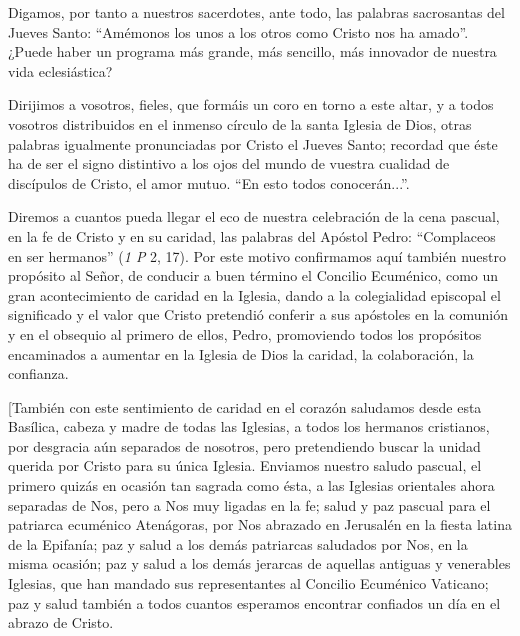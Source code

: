 			\begin{body}Digamos, por tanto a nuestros sacerdotes, ante todo, las palabras sacrosantas del Jueves Santo: “Amémonos los unos a los otros como Cristo nos ha amado”. ¿Puede haber un programa más grande, más sencillo, más innovador de nuestra vida eclesiástica?\end{body}
			
			\begin{body}Dirijimos a vosotros, fieles, que formáis un coro en torno a este altar, y a todos vosotros distribuidos en el inmenso círculo de la santa Iglesia de Dios, otras palabras igualmente pronunciadas por Cristo el Jueves Santo; recordad que éste ha de ser el signo distintivo a los ojos del mundo de vuestra cualidad de discípulos de Cristo, el amor mutuo. “En esto todos conocerán...”.\end{body}
			
			\begin{body}Diremos a cuantos pueda llegar el eco de nuestra celebración de la cena pascual, en la fe de Cristo y en su caridad, las palabras del Apóstol Pedro: “Complaceos en ser hermanos” (\textit{1 P} 2, 17). Por este motivo confirmamos aquí también nuestro propósito al Señor, de conducir a buen término el Concilio Ecuménico, como un gran acontecimiento de caridad en la Iglesia, dando a la colegialidad episcopal el significado y el valor que Cristo pretendió conferir a sus apóstoles en la comunión y en el obsequio al primero de ellos, Pedro, promoviendo todos los propósitos encaminados a aumentar en la Iglesia de Dios la caridad, la colaboración, la confianza.\end{body}
			
			\begin{body}\begin{bodysmall}[También con este sentimiento de caridad en el corazón saludamos desde esta Basílica, cabeza y madre de todas las Iglesias, a todos los hermanos cristianos, por desgracia aún separados de nosotros, pero pretendiendo buscar la unidad querida por Cristo para su única Iglesia. Enviamos nuestro saludo pascual, el primero quizás en ocasión tan sagrada como ésta, a las Iglesias orientales ahora separadas de Nos, pero a Nos muy ligadas en la fe; salud y paz pascual para el patriarca ecuménico Atenágoras, por Nos abrazado en Jerusalén en la fiesta latina de la Epifanía; paz y salud a los demás patriarcas saludados por Nos, en la misma ocasión; paz y salud a los demás jerarcas de aquellas antiguas y venerables Iglesias, que han mandado sus representantes al Concilio Ecuménico Vaticano; paz y salud también a todos cuantos esperamos encontrar confiados un día en el abrazo de Cristo.\end{bodysmall}\end{body}
			
